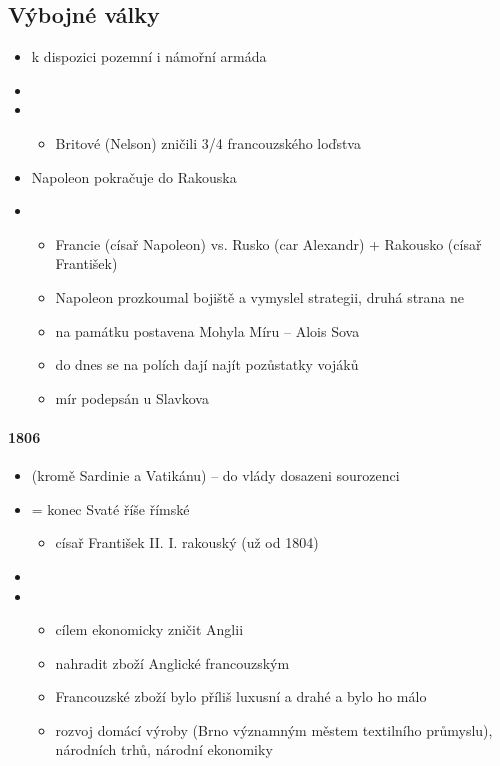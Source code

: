 \subsection{Výbojné války}
\begin{itemize}
\item k dispozici pozemní i námořní armáda
\item {}
\item {}
	\begin{itemize}
	\item Britové (Nelson) zničili 3/4 francouzského loďstva
	\end{itemize}
\item Napoleon pokračuje do Rakouska
\item {}
	\begin{itemize}
	\item Francie (císař Napoleon) vs. Rusko (car Alexandr) + Rakousko (císař František)
	\item Napoleon prozkoumal bojiště a vymyslel strategii, druhá strana ne
	\item na památku postavena Mohyla Míru -- Alois Sova
	\item do dnes se na polích dají najít pozůstatky vojáků
	\item mír podepsán u Slavkova
	\end{itemize}
\end{itemize}

\paragraph{1806}
\begin{itemize}
\item {} (kromě Sardinie a Vatikánu) -- do vlády dosazeni sourozenci
\item {} = konec Svaté říše římské
	\begin{itemize}
	\item císař František II. \ra I. rakouský (už od 1804)
	\end{itemize}
\item {}
\item {}
	\begin{itemize}
	\item cílem ekonomicky zničit Anglii 
	\item nahradit zboží Anglické francouzským
	\item Francouzské zboží bylo příliš luxusní a drahé a bylo ho málo
	\item[\ra] rozvoj domácí výroby (Brno významným městem textilního průmyslu), národních trhů, národní ekonomiky
	\end{itemize}
\end{itemize}

